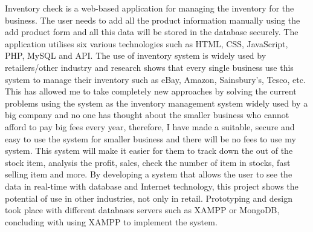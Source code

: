 Inventory check is a web-based application for managing the inventory for the business. The user needs to add all the product information manually using the add product form and all this data will be stored in the database securely. The application utilises six various technologies such as HTML, CSS, JavaScript, PHP, MySQL and API.\newline
\newline The use of inventory system is widely used by retailers/other industry and research shows that every single business use this system to manage their inventory such as eBay, Amazon, Sainsbury's, Tesco, etc. This has allowed me to take completely new approaches by solving the current problems using the system as the inventory management system widely used by a big company and no one has thought about the smaller business who cannot afford to pay big fees every year, therefore, I have made a suitable, secure and easy to use the system for smaller business and there will be no fees to use my system. This system will make it easier for them to track down the out of the stock item, analysis the profit, sales, check the number of item in stocks, fast selling item and more.\newline
\newline By developing a system that allows the user to see the data in real-time with database and Internet technology, this project shows the potential of use in other industries, not only in retail. Prototyping and design took place with different databases servers such as XAMPP or MongoDB, concluding with using XAMPP to implement the system.